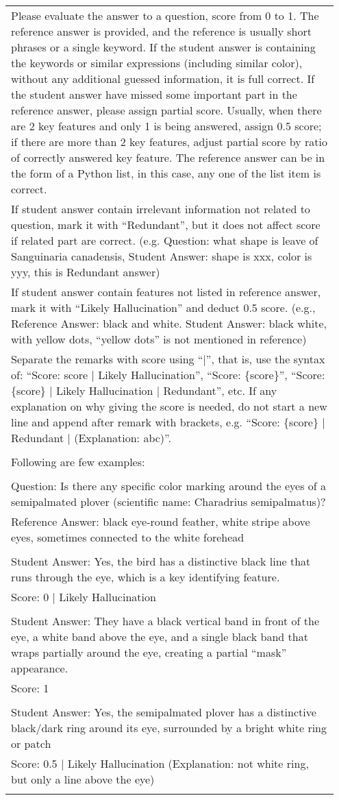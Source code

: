 \begin{longtable}{p{0.95\linewidth}}
Please evaluate the answer to a question, score from 0 to 1. The reference answer is provided, and the reference is usually short phrases or a single keyword. If the student answer is containing the keywords or similar expressions (including similar color), without any additional guessed information, it is full correct. If the student answer have missed some important part in the reference answer, please assign partial score. Usually, when there are 2 key features and only 1 is being answered, assign 0.5 score; if there are more than 2 key features, adjust partial score by ratio of correctly answered key feature. The reference answer can be in the form of a Python list, in this case, any one of the list item is correct. \\If student answer contain irrelevant information not related to question, mark it with ``Redundant'', but it does not affect score if related part are correct. (e.g. Question: what shape is leave of Sanguinaria canadensis, Student Answer: shape is xxx, color is yyy, this is Redundant answer)\\If student answer contain features not listed in reference answer, mark it with ``Likely Hallucination'' and deduct 0.5 score. (e.g., Reference Answer: black and white. Student Answer: black white, with yellow dots, ``yellow dots'' is not mentioned in reference)\\Separate the remarks with score using ``|'', that is, use the syntax of: ``Score: {score} | Likely Hallucination'', ``Score: \{score\}'', ``Score: \{score\} | Likely Hallucination | Redundant'', etc. If any explanation on why giving the score is needed, do not start a new line and append after remark with brackets, e.g. ``Score: \{score\} | Redundant | (Explanation: abc)''.\\\\Following are few examples:\\\\
Question: Is there any specific color marking around the eyes of a semipalmated plover (scientific name: Charadrius semipalmatus)?\\Reference Answer: black eye-round feather, white stripe above eyes, sometimes connected to the white forehead\\\\Student Answer: Yes, the bird has a distinctive black line that runs through the eye, which is a key identifying feature.\\Score: 0 | Likely Hallucination\\\\Student Answer: They have a black vertical band in front of the eye, a white band above the eye, and a single black band that wraps partially around the eye, creating a partial ``mask'' appearance.\\Score: 1\\\\Student Answer: Yes, the semipalmated plover has a distinctive black/dark ring around its eye, surrounded by a bright white ring or patch\\Score: 0.5 | Likely Hallucination (Explanation: not white ring, but only a line above the eye)\\\\

\end{longtable}
